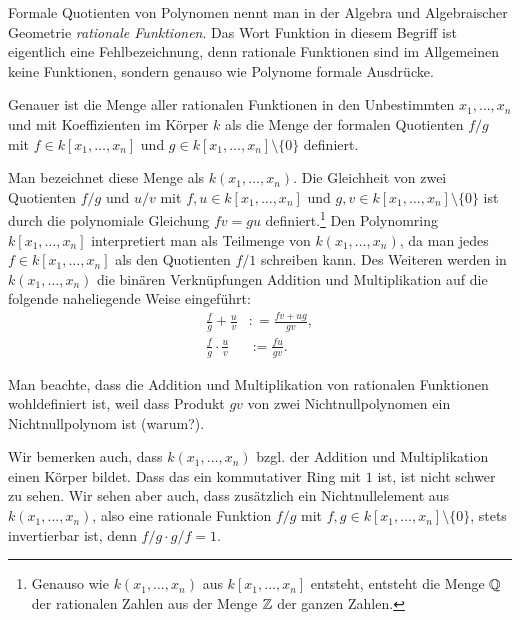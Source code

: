 \documentclass[11pt]{article}
\numberwithin{equation}{section}
\begin{document}
\begin{definition}
Formale Quotienten von Polynomen nennt man in der Algebra und Algebraischer Geometrie \emph{rationale Funktionen}. Das Wort Funktion in diesem Begriff ist eigentlich eine Fehlbezeichnung, denn rationale Funktionen sind im Allgemeinen keine Funktionen, sondern genauso wie Polynome formale Ausdrücke. 

Genauer ist die Menge aller rationalen Funktionen in den Unbestimmten $x_1,\ldots,x_n$ und mit Koeffizienten im Körper $k$ als die Menge der formalen Quotienten $f/g$ mit $f \in k[x_1,\ldots,x_n]$ und $g \in k[x_1,\ldots,x_n] \setminus \{0\}$ definiert. 

Man bezeichnet diese Menge als $k(x_1,\ldots,x_n)$. Die Gleichheit von zwei Quotienten $f/g$ und $u/v$ mit $f,u \in k[x_1,\ldots,x_n]$ und $g,v \in k[x_1,\ldots,x_n] \setminus \{0\}$ ist durch die polynomiale Gleichung $f v = g u$ definiert.\footnote{Genauso wie $k(x_1,\ldots,x_n)$ aus $k[x_1,\ldots,x_n]$ entsteht, entsteht die Menge $\mathbb{Q}$ der rationalen Zahlen aus der Menge $\mathbb{Z}$ der ganzen Zahlen.} Den Polynomring $k[x_1,\ldots,x_n]$ interpretiert man als Teilmenge von  $k(x_1,\ldots,x_n)$, da man jedes $f \in k[x_1,\ldots,x_n]$ als den Quotienten $f/1$ schreiben kann. Des Weiteren werden in $k(x_1,\ldots,x_n)$ die binären Verknüpfungen Addition und Multiplikation auf die folgende naheliegende Weise eingeführt: 
\begin{align*}
		\frac{f}{g}  + \frac{u}{v} & : = \frac{f v + u g}{gv},
		\\ \frac{f}{g} \cdot \frac{u}{v} & := \frac{f u}{g v}. 
\end{align*} 
\end{definition} 
Man beachte, dass die Addition und Multiplikation von rationalen Funktionen wohldefiniert ist, weil dass Produkt $g v$ von zwei Nichtnullpolynomen ein Nichtnullpolynom ist (warum?). 

\begin{remark} 
Wir bemerken auch, dass $k(x_1,\ldots,x_n)$ bzgl. der Addition und Multiplikation einen Körper bildet. Dass das ein kommutativer Ring mit $1$ ist, ist nicht schwer zu sehen. Wir sehen aber auch, dass zusätzlich ein Nichtnullelement aus $k(x_1,\ldots,x_n)$, also eine rationale Funktion $f/g$ mit $f,g \in k[x_1,\ldots,x_n] \setminus \{0\}$, stets invertierbar ist, denn $f/g \cdot g/f = 1$. 
\end{remark} 
\end{document}
